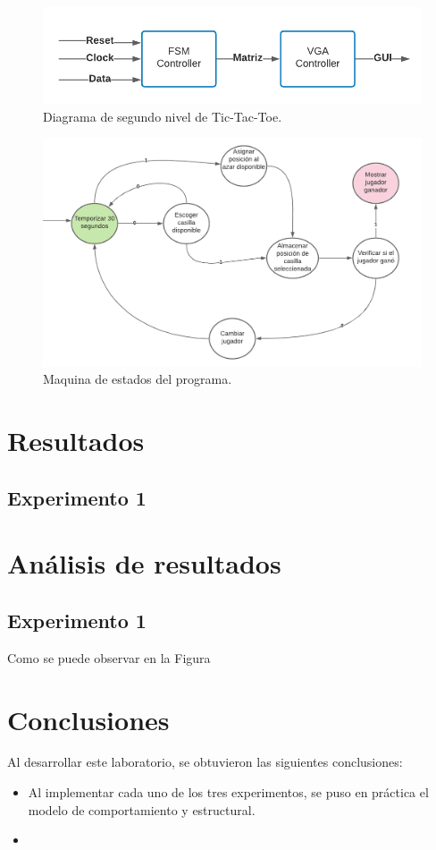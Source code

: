 \documentclass[journal,trans]{IEEEtran}
\begin{document}
	
	\begin{figure}[hbtp]
		\centering
		\includegraphics[width = \columnwidth]{imagenes/SegundoN.png}
		\caption[Figura1]{Diagrama de segundo nivel de Tic-Tac-Toe.}
		\label{fig:SegundoN}
	\end{figure}
	
	
	\begin{figure}[hbtp]
		\centering
		\includegraphics[width = \columnwidth]{imagenes/MaqEst.png}
		\caption[Figura1]{Maquina de estados del programa.}
		\label{fig:MaqEst}
	\end{figure}
	
	
	
	\section{Resultados}
	
	
	\subsection{Experimento 1}
	
	
	\section{Análisis de resultados} 
	
	\subsection {Experimento 1}
	Como se puede observar en la Figura
	
	
	
	\section{Conclusiones}
	Al desarrollar este laboratorio, se obtuvieron las siguientes conclusiones:
	
	
	\begin{itemize}
		\item Al implementar cada uno de los tres experimentos, se puso en práctica el modelo de comportamiento y estructural.
		\item 
	\end{itemize}
	
\end{document}
